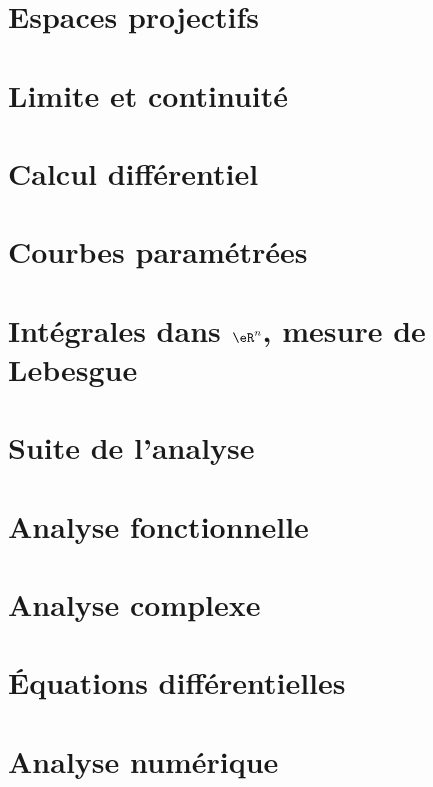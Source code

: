 \chapter{Espaces projectifs}



\chapter{Limite et continuité}


\chapter{Calcul différentiel}


\chapter{Courbes paramétrées}           \label{Chap_courbes}


\chapter{Intégrales dans \texorpdfstring{$\eR^n$}{Rn}, mesure de Lebesgue}


\chapter{Suite de l'analyse}









\chapter{Analyse fonctionnelle}


\chapter{Analyse complexe}


\chapter{Équations différentielles}


\chapter{Analyse numérique}


